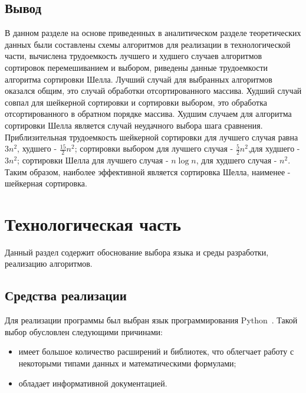 \documentclass[12pt]{report}
\begin{document}
    \section{Вывод}
    В данном разделе на основе приведенных в аналитическом разделе теоретических данных
    были составлены схемы алгоритмов для реализации в технологической части,
    вычислена трудоемкость лучшего и худшего случаев алгоритмов сортировок перемешиванием и выбором,
    риведены данные трудоемкости алгоритма сортировки Шелла.
    Лучший случай для выбранных алгоритмов оказался общим, это случай обработки отсортированного массива.
    Худший случай совпал для шейкерной сортировки и сортировки выбором,
    это обработка отсортированного в обратном порядке массива.
    Худшим случаем для алгоритма сортировки Шелла является случай неудачного выбора шага сравнения.
    Приблизительная трудоемкость шейкерной сортировки для лучшего случая равна $3n^2$,
    худшего - $\frac{15}{2}n^2$; сортировки выбором для лучшего случая - $\frac{5}{2}n^2$,для худшего - $3n^2$;
    сортировки Шелла для лучшего случая - $n \log n$, для худшего случая - $n^2$.
    Таким образом, наиболее эффективной является сортировка Шелла, наименее - шейкерная сортировка.
    \newpage


    \chapter{Технологическая часть}
    Данный раздел содержит обоснование выбора языка и среды разработки, реализацию алгоритмов.


    \section{Средства реализации}
    Для реализации программы был выбран язык программирования Python~\cite{python}.
    Такой выбор обусловлен следующими причинами:
    \begin{itemize}
        \item имеет большое количество расширений и библиотек,
        что облегчает работу с некоторыми типами данных и математическими формулами;
        \item обладает информативной документацией.
    \end{itemize}
\end{document}
